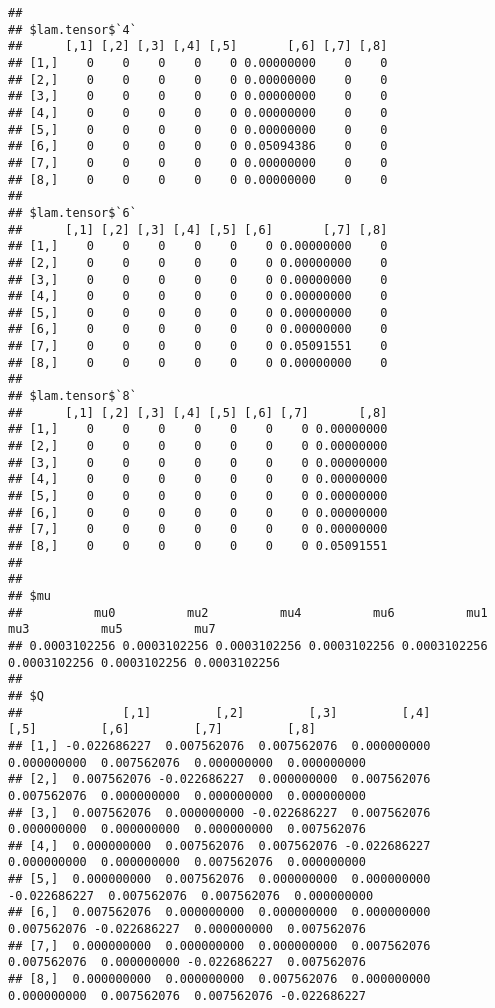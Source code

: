 \documentclass[
]{article}
\begin{document}
\begin{verbatim}
## 
## $lam.tensor$`4`
##      [,1] [,2] [,3] [,4] [,5]       [,6] [,7] [,8]
## [1,]    0    0    0    0    0 0.00000000    0    0
## [2,]    0    0    0    0    0 0.00000000    0    0
## [3,]    0    0    0    0    0 0.00000000    0    0
## [4,]    0    0    0    0    0 0.00000000    0    0
## [5,]    0    0    0    0    0 0.00000000    0    0
## [6,]    0    0    0    0    0 0.05094386    0    0
## [7,]    0    0    0    0    0 0.00000000    0    0
## [8,]    0    0    0    0    0 0.00000000    0    0
## 
## $lam.tensor$`6`
##      [,1] [,2] [,3] [,4] [,5] [,6]       [,7] [,8]
## [1,]    0    0    0    0    0    0 0.00000000    0
## [2,]    0    0    0    0    0    0 0.00000000    0
## [3,]    0    0    0    0    0    0 0.00000000    0
## [4,]    0    0    0    0    0    0 0.00000000    0
## [5,]    0    0    0    0    0    0 0.00000000    0
## [6,]    0    0    0    0    0    0 0.00000000    0
## [7,]    0    0    0    0    0    0 0.05091551    0
## [8,]    0    0    0    0    0    0 0.00000000    0
## 
## $lam.tensor$`8`
##      [,1] [,2] [,3] [,4] [,5] [,6] [,7]       [,8]
## [1,]    0    0    0    0    0    0    0 0.00000000
## [2,]    0    0    0    0    0    0    0 0.00000000
## [3,]    0    0    0    0    0    0    0 0.00000000
## [4,]    0    0    0    0    0    0    0 0.00000000
## [5,]    0    0    0    0    0    0    0 0.00000000
## [6,]    0    0    0    0    0    0    0 0.00000000
## [7,]    0    0    0    0    0    0    0 0.00000000
## [8,]    0    0    0    0    0    0    0 0.05091551
## 
## 
## $mu
##          mu0          mu2          mu4          mu6          mu1          mu3          mu5          mu7 
## 0.0003102256 0.0003102256 0.0003102256 0.0003102256 0.0003102256 0.0003102256 0.0003102256 0.0003102256 
## 
## $Q
##              [,1]         [,2]         [,3]         [,4]         [,5]         [,6]         [,7]         [,8]
## [1,] -0.022686227  0.007562076  0.007562076  0.000000000  0.000000000  0.007562076  0.000000000  0.000000000
## [2,]  0.007562076 -0.022686227  0.000000000  0.007562076  0.007562076  0.000000000  0.000000000  0.000000000
## [3,]  0.007562076  0.000000000 -0.022686227  0.007562076  0.000000000  0.000000000  0.000000000  0.007562076
## [4,]  0.000000000  0.007562076  0.007562076 -0.022686227  0.000000000  0.000000000  0.007562076  0.000000000
## [5,]  0.000000000  0.007562076  0.000000000  0.000000000 -0.022686227  0.007562076  0.007562076  0.000000000
## [6,]  0.007562076  0.000000000  0.000000000  0.000000000  0.007562076 -0.022686227  0.000000000  0.007562076
## [7,]  0.000000000  0.000000000  0.000000000  0.007562076  0.007562076  0.000000000 -0.022686227  0.007562076
## [8,]  0.000000000  0.000000000  0.007562076  0.000000000  0.000000000  0.007562076  0.007562076 -0.022686227
\end{verbatim}
\end{document}
